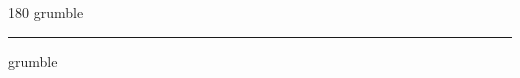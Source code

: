 
\begin{frame}
\begin{center}
\begin{turn}{180}
{\fontsize{2.5cm}{1em}\selectfont grumble}
\end{turn}
\vspace{1em}\par  
\hrule
\vspace{1em}\par  
{\fontsize{2.5cm}{1em}\selectfont grumble}
\end{center}
\end{frame}
